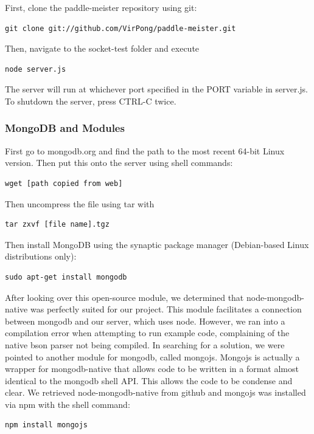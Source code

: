 \documentclass[letterpaper,12pt]{article}
\begin{document}
First, clone the paddle-meister repository using git:

\begin{verbatim}
git clone git://github.com/VirPong/paddle-meister.git
\end{verbatim}

Then, navigate to the socket-test folder and execute

\begin{verbatim}
node server.js
\end{verbatim}

The server will run at whichever port specified in the PORT variable in server.js. To shutdown the server, press CTRL-C twice.

\subsubsection{MongoDB and Modules}
First go to mongodb.org and find the path to the most recent 64-bit Linux version. Then put this onto the server using shell commands:

\begin{verbatim}
wget [path copied from web]
\end{verbatim}
Then uncompress the file using tar with

\begin{verbatim}
tar zxvf [file name].tgz
\end{verbatim}

Then install MongoDB using the synaptic package manager (Debian-based Linux distributions only):
\begin{verbatim}
sudo apt-get install mongodb
\end{verbatim}

After looking over this open-source module, we determined that node-mongodb-native was perfectly suited for our project. This module facilitates a connection between mongodb and our server, which uses node. However, we ran into a compilation error when attempting to run example code, complaining of the native bson parser not being compiled.
In searching for a solution, we were pointed to another module for mongodb, called mongojs. Mongojs is actually a wrapper for mongodb-native that allows code to be written in a format almost identical to the mongodb shell API. This allows the code to be condense and clear.
We retrieved node-mongodb-native from github and mongojs was installed via npm with the shell command:

\begin{verbatim}
npm install mongojs
\end{verbatim}
\end{document}
